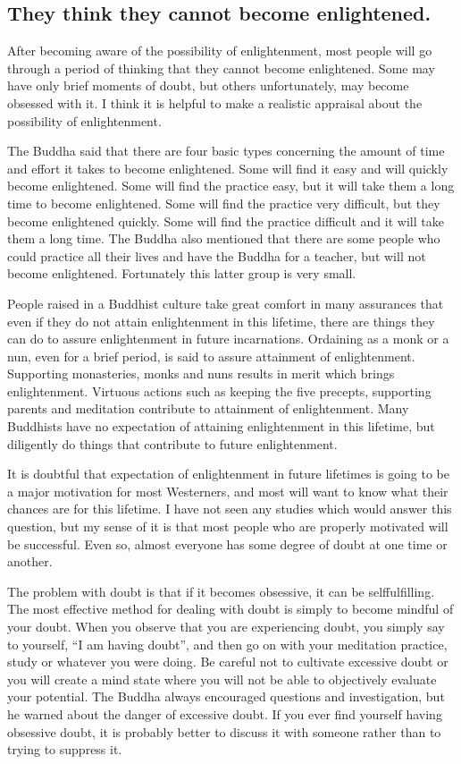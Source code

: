 \documentclass[a5paper,10pt,english]{book}
\begin{document}
\subsection{They think they cannot become enlightened.}
\label{\detokenize{saints:they-think-they-cannot-become-enlightened}}
\sphinxAtStartPar
After becoming aware of the possibility of enlightenment, most people
will go through a period of thinking that they cannot become
enlightened. Some may have only brief moments of doubt, but others
unfortunately, may become obsessed with it. I think it is helpful to
make a realistic appraisal about the possibility of enlightenment.

\sphinxAtStartPar
The Buddha said that there are four basic types concerning the amount of
time and effort it takes to become enlightened. Some will find it easy
and will quickly become enlightened. Some will find the practice easy,
but it will take them a long time to become enlightened. Some will find
the practice very difficult, but they become enlightened quickly. Some
will find the practice difficult and it will take them a long time. The
Buddha also mentioned that there are some people who could practice all
their lives and have the Buddha for a teacher, but will not become
enlightened. Fortunately this latter group is very small.

\sphinxAtStartPar
People raised in a Buddhist culture take great comfort in many
assurances that even if they do not attain enlightenment in this
lifetime, there are things they can do to assure enlightenment in future
incarnations. Ordaining as a monk or a nun, even for a brief period, is
said to assure attainment of enlightenment. Supporting monasteries,
monks and nuns results in merit which brings enlightenment. Virtuous
actions such as keeping the five precepts, supporting parents and
meditation contribute to attainment of enlightenment. Many Buddhists have
no expectation of attaining enlightenment in this lifetime, but
diligently do things that contribute to future enlightenment.

\sphinxAtStartPar
It is doubtful that expectation of enlightenment in future lifetimes is
going to be a major motivation for most Westerners, and most will want
to know what their chances are for this lifetime. I have not seen any
studies which would answer this question, but my sense of it is that
most people who are properly motivated will be successful. Even so,
almost everyone has some degree of doubt at one time or another.

\sphinxAtStartPar
The problem with doubt is that if it becomes obsessive, it can be
self\sphinxhyphen{}fulfilling. The most effective method for dealing with doubt is
simply to become mindful of your doubt. When you observe that you are
experiencing doubt, you simply say to yourself, “I am having doubt”, and
then go on with your meditation practice, study or whatever you were
doing. Be careful not to cultivate excessive doubt or you will create a
mind state where you will not be able to objectively evaluate your
potential. The Buddha always encouraged questions and investigation, but
he warned about the danger of excessive doubt. If you ever find yourself
having obsessive doubt, it is probably better to discuss it with someone
rather than to trying to suppress it.
\end{document}
